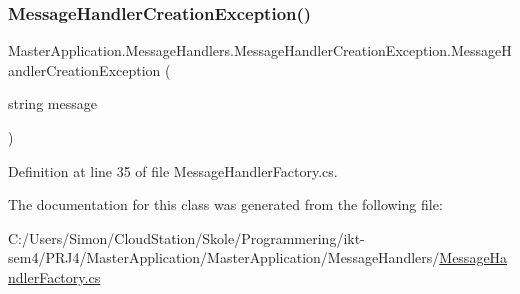 \subsubsection{\texorpdfstring{Message\+Handler\+Creation\+Exception()}{MessageHandlerCreationException()}}
{\footnotesize\ttfamily Master\+Application.\+Message\+Handlers.\+Message\+Handler\+Creation\+Exception.\+Message\+Handler\+Creation\+Exception (\begin{DoxyParamCaption}\item[{string}]{message }\end{DoxyParamCaption})}



Definition at line 35 of file Message\+Handler\+Factory.\+cs.



The documentation for this class was generated from the following file\+:\begin{DoxyCompactItemize}
\item 
C\+:/\+Users/\+Simon/\+Cloud\+Station/\+Skole/\+Programmering/ikt-\/sem4/\+P\+R\+J4/\+Master\+Application/\+Master\+Application/\+Message\+Handlers/\mbox{\hyperlink{_message_handler_factory_8cs}{Message\+Handler\+Factory.\+cs}}\end{DoxyCompactItemize}
